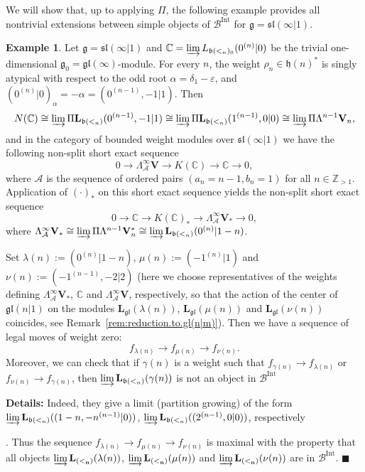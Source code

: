 \documentclass[12pt]{amsart}
\newcommand\C{\mathbb{C}}
\newcommand\Z{\mathbb{Z}}
\newcommand\g{\mathfrak{g}}
\newcommand\fh{\mathfrak{h}}
\newcommand\fb{\mathfrak{b}}
\newcommand\fsl{\mathfrak{sl}}
\newcommand\fgl{\mathfrak{gl}}
\newcommand\cA{\mathcal{A}}
\newcommand\cB{\mathcal{B}}
\newcommand\bV{\mathbf{V}}
\newcommand\bL{\mathbf{L}}
\DeclareMathOperator{\Int}{Int}
\theoremstyle{plain}
\theoremstyle{definition}
\newtheorem{example}[theo]{Example}
\numberwithin{equation}{section}
\newcommand\xqed[1]{%
  \leavevmode\unskip\penalty9999 \hbox{}\nobreak\hfill
  \quad\hbox{#1}}
\newcommand\demo{\xqed{$\blacksquare$}}
\newcommand{\details}[1]{\smallskip \color{blue} \begin{footnotesize} \textbf{Details:} #1 \end{footnotesize} \color{black}}
\newcommand{\details}[1]{}
\begin{document}
We will show that, up to applying $\Pi$, the following example provides all nontrivial extensions between simple objects of $\cB^{\Int}$ for $\g=\fsl(\infty|1)$.

\begin{example}\label{ex:nontrivial.ext}
Let $\g=\fsl(\infty|1)$ and $\C = \varinjlim L_{\fb(<_n)_0}(0^{(n)}|0)$ be the trivial one-dimensional $\g_0=\fgl(\infty)$-module. For every $n$, the weight $\rho_n\in \fh(n)^*$ is singly atypical with respect to the odd root $\alpha = \delta_1-\varepsilon$, and $(0^{(n)}|0)_\alpha = -\alpha = (0^{(n-1)}, -1|1)$. Then 
	\[
N(\C)\cong \varinjlim \Pi\bL_{\fb(<_n)}(0^{(n-1)}, -1|1) \cong \varinjlim  \Pi\bL_{\fb(<_n)}(1^{(n-1)}, 0|0) \cong \varinjlim \Pi \Lambda^{n-1}\bV_n,
	\] 
and in the category of bounded weight modules over $\fsl(\infty|1)$ we have the following non-split short exact sequence 
	\[
0\to \Lambda_\cA^\infty \bV \to K(\C)\to \C\to 0,
	\]
where $\cA $ is the sequence of ordered pairs $(a_n = n-1, b_n = 1)$ for all $n\in \Z_{>1}$.  Application of $(\cdot)_*$ on this short exact sequence yields the non-split short exact sequence
	\[
0\to \C \to K(\C)_*\to \Lambda_\cA^\infty \bV_*\to 0,
	\]
where $\Lambda_\cA^\infty \bV_*\cong \varinjlim \Pi\Lambda^{n-1}\bV_n^* \cong \varinjlim \bL_{\fb(<_n)}(0^{(n)}|1-n)$.

Set $\lambda(n):=(0^{(n)}|1-n)$, $\mu(n):=(-1^{(n)}|1)$ and $\nu(n):=(-1^{(n-1)},-2|2)$ (here we choose representatives of the weights defining $\Lambda_\cA^\infty \bV_*$, $\C$ and $\Lambda_\cA^\infty \bV$, respectively, so that the action of the center of $\fgl(n|1)$ on the modules $\bL_{\fgl}(\lambda(n))$, $\bL_{\fgl}(\mu(n))$ and $\bL_{\fgl}(\nu(n))$ coincides, see Remark~\ref{rem:reduction.to.gl(n|m)}). Then we have a sequence of legal moves of weight zero:
	\[
f_{\lambda(n)}\to f_{\mu(n)}\to f_{\nu(n)}.
	\]
Moreover, we can check that if $\gamma(n)$ is a weight such that $f_{\gamma(n)}\to f_{\lambda(n)}$ or $f_{\nu(n)}\to f_{\gamma(n)}$, then $\varinjlim \bL_{\fb(<_n)}(\gamma(n))$ is not an object in $\cB^{\Int}${\details{Indeed, they give a limit (partition growing) of the form $\varinjlim \bL_{\fb(<_n)}((1-n, -n^{(n-1)}|0))$, $\varinjlim \bL_{\fb(<_n)}((2^{(n-1)},0|0))$, respectively}}. Thus the sequence $f_{\lambda(n)}\to f_{\mu(n)}\to f_{\nu(n)}$ is maximal with the property that all objects $\varinjlim \bL_{\bf(<_n)}(\lambda(n))$, $\varinjlim \bL_{\bf(<_n)}(\mu(n))$ and $\varinjlim \bL_{\bf(<_n)}(\nu(n))$ are in $\cB^{\Int}$.
\demo
\end{example}
\end{document}
